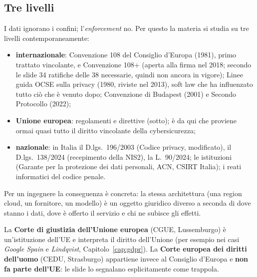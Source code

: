 \subsection{Tre livelli}
I dati ignorano i confini; l'\emph{enforcement} no. Per questo la materia si studia su tre livelli
contemporaneamente:
\begin{itemize}
  \item \textbf{internazionale}: Convenzione 108 del Consiglio d'Europa (1981), primo trattato
    vincolante, e Convenzione 108+ (aperta alla firma nel 2018; secondo le slide 34 ratifiche delle 38
    necessarie, quindi non ancora in vigore); Linee guida OCSE sulla privacy (1980, riviste nel 2013),
    soft law che ha influenzato tutto ciò che è venuto dopo; Convenzione di Budapest (2001) e Secondo
    Protocollo (2022);
  \item \textbf{Unione europea}: regolamenti e direttive (sotto); è da qui che proviene ormai quasi tutto
    il diritto vincolante della cybersicurezza;
  \item \textbf{nazionale}: in Italia il D.lgs.~196/2003 (Codice privacy, modificato), il
    D.lgs.~138/2024 (recepimento della NIS2), la L.~90/2024; le istituzioni (Garante per la protezione
    dei dati personali, ACN, CSIRT Italia); i reati informatici del codice penale.
\end{itemize}
Per un ingegnere la conseguenza è concreta: la stessa architettura (una region cloud, un fornitore, un
modello) è un oggetto giuridico diverso a seconda di dove stanno i dati, dove è offerto il servizio e chi
ne subisce gli effetti.

\begin{nota}
La \textbf{Corte di giustizia dell'Unione europea} (CGUE, Lussemburgo) è un'istituzione dell'UE e
interpreta il diritto dell'Unione (per esempio nei casi \emph{Google Spain} e \emph{Lindqvist},
Capitolo~\ref{cap:gdpr}). La \textbf{Corte europea dei diritti dell'uomo} (CEDU, Strasburgo)
appartiene invece al Consiglio d'Europa e \textbf{non fa parte dell'UE}: le slide lo segnalano
esplicitamente come trappola.
\end{nota}

